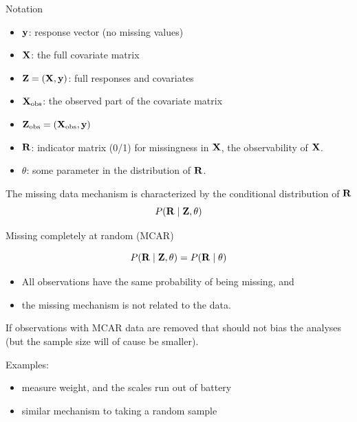 \documentclass[
  ignorenonframetext,
]{beamer}
\providecommand{\tightlist}{%
  \setlength{\itemsep}{0pt}\setlength{\parskip}{0pt}}
\begin{document}
\begin{frame}

\begin{block}{Notation}

\begin{itemize}
\tightlist
\item
  \({\bf y}\): response vector (no missing values)
\item
  \({\bf X}\): the full covariate matrix
\item
  \({\bf Z}=({\bf X},{\bf y})\): full responses and covariates
\item
  \({\bf X}_{\text{obs}}\): the observed part of the covariate matrix
\item
  \({\bf Z}_{\text{obs}}=({\bf X}_{\text{obs}},{\bf y})\)
\item
  \({\bf R}\): indicator matrix (0/1) for missingness in \({\bf X}\),
  the observability of \({\bf X}\).
\item
  \(\theta\): some parameter in the distribution of \({\bf R}\).
\end{itemize}

The missing data mechanism is characterized by the conditional
distribution of \({\bf R}\) \[P({\bf R} \mid {\bf Z},\theta)\]

\end{block}

\end{frame}

\begin{frame}

\begin{block}{Missing completely at random (MCAR)}

\[P({\bf R} \mid {\bf Z},\theta)=P({\bf R} \mid \theta)\]

\begin{itemize}
\tightlist
\item
  All observations have the same probability of being missing, and
\item
  the missing mechanism is not related to the data.
\end{itemize}

If observations with MCAR data are removed that should not bias the
analyses (but the sample size will of cause be smaller).

Examples:

\begin{itemize}
\tightlist
\item
  measure weight, and the scales run out of battery
\item
  similar mechanism to taking a random sample
\end{itemize}

\end{block}

\end{frame}
\end{document}

